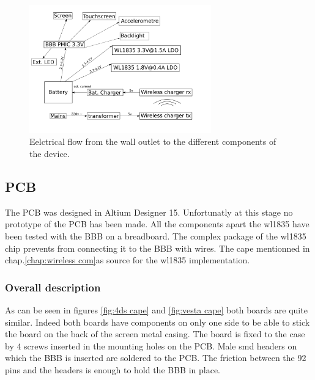 \begin{figure}[!ht]
    \centering
    \includegraphics[width=0.7\textwidth,keepaspectratio]{chap/hardFig/vesta_power_management}
    \caption{Eelctrical flow from the wall outlet to the different components of the device.}
    \label{fig:power flow}
\end{figure}




\subsection{PCB}
\label{chap:pcb}
The PCB was designed in Altium Designer 15. Unfortunatly at this stage no prototype of the PCB has been made. All the components apart the wl1835 have been tested with the BBB on a breadboard. The complex package of the wl1835 chip prevents from connecting it to the BBB with wires. The cape mentionned in chap.\ref{chap:wireless com}as source for the wl1835 implementation.

\subsubsection{Overall description}

As can be seen in figures \ref{fig:4ds cape} and \ref{fig:vesta cape} both boards are quite similar. Indeed both boards have components on only one side to be able to stick the board on the back of the screen metal casing. The board is fixed to the case by 4 screws inserted in the mounting holes on the PCB.
Male smd headers on which the BBB is inserted are soldered to the PCB. The friction between the 92 pins and the headers is enough to hold the BBB in place.

